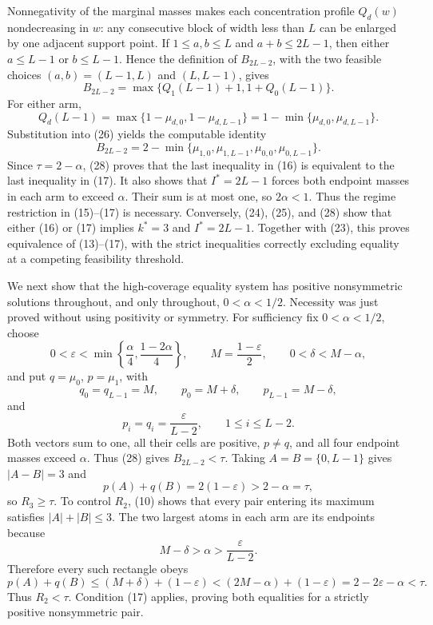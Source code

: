 Nonnegativity of the marginal masses makes each concentration profile \(Q_d(w)\) nondecreasing in \(w\): any consecutive block of width less than \(L\) can be enlarged by one adjacent support point.  If \(1\leq a,b\leq L\) and \(a+b\leq2L-1\), then either \(a\leq L-1\) or \(b\leq L-1\).  Hence the definition of \(B_{2L-2}\), with the two feasible choices \((a,b)=(L-1,L)\) and \((L,L-1)\), gives
\[
 B_{2L-2}=\max\{Q_1(L-1)+1,1+Q_0(L-1)\}. \tag{26}
\]
For either arm,
\[
 Q_d(L-1)
 =\max\{1-\mu_{d,0},1-\mu_{d,L-1}\}
 =1-\min\{\mu_{d,0},\mu_{d,L-1}\}. \tag{27}
\]
Substitution into (26) yields the computable identity
\[
 B_{2L-2}
 =2-\min\{\mu_{1,0},\mu_{1,L-1},\mu_{0,0},\mu_{0,L-1}\}. \tag{28}
\]
Since \(\tau=2-\alpha\), (28) proves that the last inequality in (16) is equivalent to the last inequality in (17).  It also shows that \(I^*=2L-1\) forces both endpoint masses in each arm to exceed \(\alpha\).  Their sum is at most one, so \(2\alpha<1\).  Thus the regime restriction in (15)--(17) is necessary.  Conversely, (24), (25), and (28) show that either (16) or (17) implies \(k^*=3\) and \(I^*=2L-1\).  Together with (23), this proves equivalence of (13)--(17), with the strict inequalities correctly excluding equality at a competing feasibility threshold.

We next show that the high-coverage equality system has positive nonsymmetric solutions throughout, and only throughout, \(0<\alpha<1/2\).  Necessity was just proved without using positivity or symmetry.  For sufficiency fix \(0<\alpha<1/2\), choose
\[
 0<\varepsilon<\min\!\left\{\frac\alpha4,\frac{1-2\alpha}{4}\right\},
 \qquad M=\frac{1-\varepsilon}{2},
 \qquad 0<\delta<M-\alpha,
\]
and put \(q=\mu_0\), \(p=\mu_1\), with
\[
 q_0=q_{L-1}=M,
 \qquad p_0=M+\delta,
 \qquad p_{L-1}=M-\delta,
\]
and
\[
 p_i=q_i=\frac{\varepsilon}{L-2},
 \qquad 1\leq i\leq L-2.
\]
Both vectors sum to one, all their cells are positive, \(p\neq q\), and all four endpoint masses exceed \(\alpha\).  Thus (28) gives \(B_{2L-2}<\tau\).  Taking \(A=B=\{0,L-1\}\) gives \(|A-B|=3\) and
\[
 p(A)+q(B)=2(1-\varepsilon)>2-\alpha=\tau,
\]
so \(R_3\geq\tau\).  To control \(R_2\), (10) shows that every pair entering its maximum satisfies \(|A|+|B|\leq3\).  The two largest atoms in each arm are its endpoints because
\[
 M-\delta>\alpha>\frac{\varepsilon}{L-2}.
\]
Therefore every such rectangle obeys
\[
 p(A)+q(B)
 \leq (M+\delta)+(1-\varepsilon)
 <(2M-\alpha)+(1-\varepsilon)
 =2-2\varepsilon-\alpha
 <\tau. \tag{29}
\]
Thus \(R_2<\tau\).  Condition (17) applies, proving both equalities for a strictly positive nonsymmetric pair.

